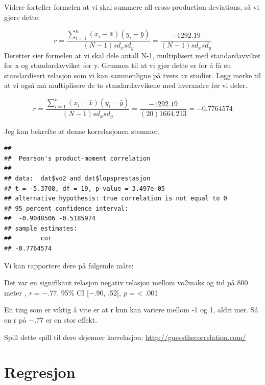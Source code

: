 \documentclass[
]{book}
\newenvironment{Shaded}{\begin{snugshade}}{\end{snugshade}}
\newcommand{\AttributeTok}[1]{\textcolor[rgb]{0.77,0.63,0.00}{#1}}
\newcommand{\FunctionTok}[1]{\textcolor[rgb]{0.00,0.00,0.00}{#1}}
\newcommand{\NormalTok}[1]{#1}
\newcommand{\OtherTok}[1]{\textcolor[rgb]{0.56,0.35,0.01}{#1}}
\newcommand{\SpecialCharTok}[1]{\textcolor[rgb]{0.00,0.00,0.00}{#1}}
\newcommand{\StringTok}[1]{\textcolor[rgb]{0.31,0.60,0.02}{#1}}
\begin{document}
Videre forteller formelen at vi skal summere all cross-production deviations, så vi gjøre dette:

\[
r = \frac{\sum_{i=1}^{n}(x_i -\bar{x})(y_i -\bar{y})} {(N-1)sd_xsd_y} = \frac{-1292.19} {(N-1)sd_xsd_y}
\]
Deretter sier formelen at vi skal dele antall N-1, multiplisert med standardavviket for x og standardavviket for y. Grunnen til at vi gjør dette er for å få en standardisert relasjon som vi kan sammenligne på tvers av studier. Legg merke til at vi også må multiplisere de to standardavvikene med hverandre før vi deler.

\[
r = \frac{\sum_{i=1}^{n}(x_i -\bar{x})(y_i -\bar{y})} {(N-1)sd_xsd_y} = \frac{-1292.19} {(20)1664.213} = -0.7764574 
\]

Jeg kan bekrefte at denne korrelasjonen stemmer.

\begin{Shaded}
\end{Shaded}

\begin{verbatim}
## 
##  Pearson's product-moment correlation
## 
## data:  dat$vo2 and dat$lopsprestasjon
## t = -5.3708, df = 19, p-value = 3.497e-05
## alternative hypothesis: true correlation is not equal to 0
## 95 percent confidence interval:
##  -0.9048506 -0.5185974
## sample estimates:
##        cor 
## -0.7764574
\end{verbatim}

Vi kan rapportere dere på følgende måte:

Det var en signifikant relasjon negativ relasjon mellom vo2maks og tid på 800 meter , \emph{r} = −.77, 95\% CI {[}−.90, .52{]}, \emph{p} = \textless{} .001

En ting som er viktig å vite er at r kun kan variere mellom -1 og 1, aldri mer. Så en r på −.77 er en stor effekt.

Spill dette spill til dere skjønner korrelasjon:
\url{http://guessthecorrelation.com/}

\hypertarget{regresjon}{%
\section{Regresjon}\label{regresjon}}
\end{document}
